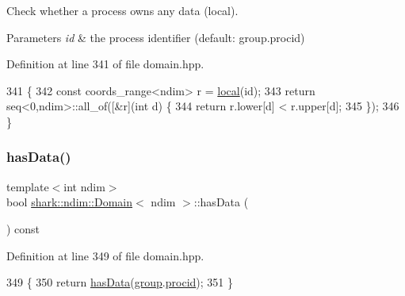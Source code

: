 Check whether a process owns any data (local). 
\begin{DoxyParams}{Parameters}
{\em id} & the process identifier (default\+: group.\+procid) \\
\hline
\end{DoxyParams}


Definition at line 341 of file domain.\+hpp.


\begin{DoxyCode}
341                                                       \{
342             \textcolor{keyword}{const} coords\_range<ndim> r = \hyperlink{classshark_1_1ndim_1_1_domain_a3351db56f9d6bd22ba473d744e3f7025}{local}(\textcolor{keywordtype}{id});
343             \textcolor{keywordflow}{return} seq<0,ndim>::all\_of([&r](\textcolor{keywordtype}{int} d) \{
344                 \textcolor{keywordflow}{return} r.lower[d] < r.upper[d];
345             \});
346         \}
\end{DoxyCode}
\hypertarget{classshark_1_1ndim_1_1_domain_a6c4491743273ca6ab3e72f5ca3f03912}{}\label{classshark_1_1ndim_1_1_domain_a6c4491743273ca6ab3e72f5ca3f03912} 
\subsubsection{\texorpdfstring{has\+Data()}{hasData()}\hspace{0.1cm}{\footnotesize\ttfamily [2/2]}}
{\footnotesize\ttfamily template$<$int ndim$>$ \\
bool \hyperlink{classshark_1_1ndim_1_1_domain}{shark\+::ndim\+::\+Domain}$<$ ndim $>$\+::has\+Data (\begin{DoxyParamCaption}{ }\end{DoxyParamCaption}) const\hspace{0.3cm}{\ttfamily [inline]}}



Definition at line 349 of file domain.\+hpp.


\begin{DoxyCode}
349                                                 \{
350             \textcolor{keywordflow}{return} \hyperlink{classshark_1_1ndim_1_1_domain_a6c4491743273ca6ab3e72f5ca3f03912}{hasData}(\hyperlink{classshark_1_1ndim_1_1_domain_a2bbf100371762ce405efd218bc1e3d0f}{group}.\hyperlink{classshark_1_1_group_af8c22a10243c3d05301280119b72c073}{procid});
351         \}
\end{DoxyCode}
\hypertarget{classshark_1_1ndim_1_1_domain_a0b21c5f42bd40695f8fc6978ff898bf4}{}\label{classshark_1_1ndim_1_1_domain_a0b21c5f42bd40695f8fc6978ff898bf4} 
